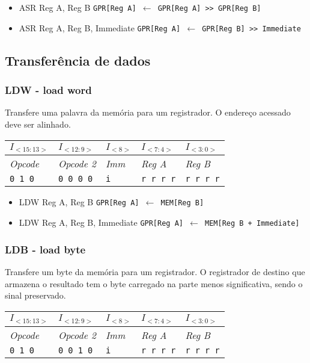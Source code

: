 \documentclass[11pt,a4paper]{report}
\begin{document}
\begin{itemize}
\item ASR Reg A, Reg B
\subitem \texttt{GPR[Reg A] $\leftarrow$ GPR[Reg A] >> GPR[Reg B]}
\item ASR Reg A, Reg B, Immediate
\subitem \texttt{GPR[Reg A] $\leftarrow$ GPR[Reg B] >> Immediate}
\end{itemize}


\subsection{Transferência de dados}

\subsubsection{LDW - load word}

Transfere uma palavra da memória para um registrador. O endereço acessado
deve ser alinhado.

\begin{table}[htb!]
\centering
\begin{tabular}{|p{2cm}|p{2cm}|p{2cm}|p{2cm}|p{2cm}|}
\hline
$I_{<15:13>}$ & $I_{<12:9>}$ & $I_{<8>}$ & $I_{<7:4>}$ & $I_{<3:0>}$  \\ \hline
\textit{Opcode} & \textit{Opcode 2} & \textit{Imm} & \textit{Reg A} & \textit{Reg B} \\ \hline
\texttt{0 1 0} & \texttt{0 0 0 0} & \texttt{i} & \texttt{r r r r} & \texttt{r r r r} \\ \hline
\end{tabular}
\end{table}

\begin{itemize}
\item LDW Reg A, Reg B
\subitem \texttt{GPR[Reg A] $\leftarrow$ MEM[Reg B]}
\item LDW Reg A, Reg B, Immediate
\subitem \texttt{GPR[Reg A] $\leftarrow$ MEM[Reg B + Immediate]}
\end{itemize}

\subsubsection{LDB - load byte}

Transfere um byte da memória para um registrador. O registrador de
destino que armazena o resultado tem o byte carregado na parte menos
significativa, sendo o sinal preservado.

\begin{table}[htb!]
\centering
\begin{tabular}{|p{2cm}|p{2cm}|p{2cm}|p{2cm}|p{2cm}|}
\hline
$I_{<15:13>}$ & $I_{<12:9>}$ & $I_{<8>}$ & $I_{<7:4>}$ & $I_{<3:0>}$  \\ \hline
\textit{Opcode} & \textit{Opcode 2} & \textit{Imm} & \textit{Reg A} & \textit{Reg B} \\ \hline
\texttt{0 1 0} & \texttt{0 0 1 0} & \texttt{i} & \texttt{r r r r} & \texttt{r r r r} \\ \hline
\end{tabular}
\end{table}
\end{document}

